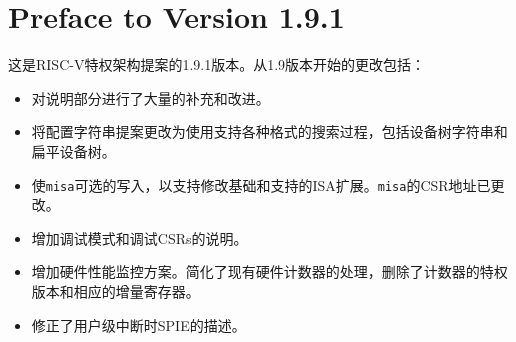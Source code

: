 \newpage

\section*{Preface to Version 1.9.1}

这是RISC-V特权架构提案的1.9.1版本。从1.9版本开始的更改包括：

\begin{itemize}
  \parskip 0pt
  \itemsep 1pt
\item 对说明部分进行了大量的补充和改进。
\item 将配置字符串提案更改为使用支持各种格式的搜索过程，包括设备树字符串和扁平设备树。
\item 使{\tt misa}可选的写入，以支持修改基础和支持的ISA扩展。{\tt misa}的CSR地址已更改。
\item 增加调试模式和调试CSRs的说明。
\item 增加硬件性能监控方案。简化了现有硬件计数器的处理，删除了计数器的特权版本和相应的增量寄存器。
\item 修正了用户级中断时SPIE的描述。
\end{itemize}



